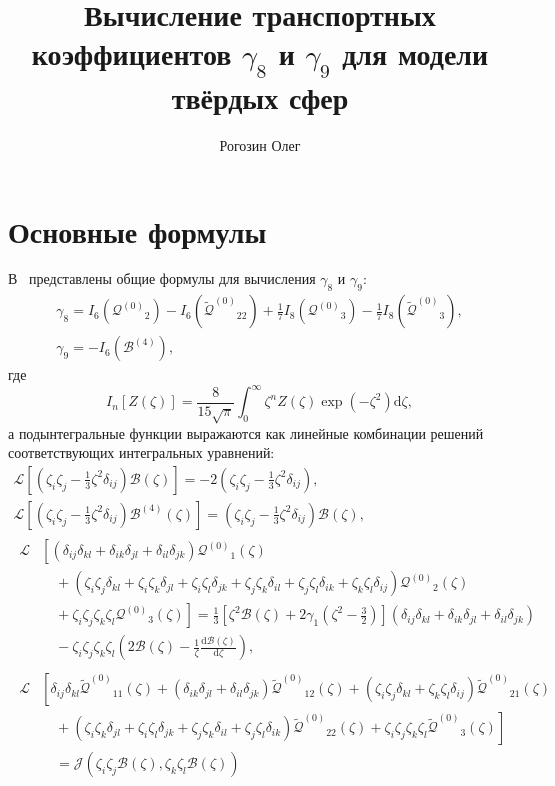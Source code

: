 \documentclass[a4paper,12pt]{article}
\title{Вычисление транспортных коэффициентов \(\gamma_8\) и \(\gamma_9\) для модели твёрдых сфер}
\author{Рогозин Олег}
\newcommand{\dd}{\mathrm{d}}
\newcommand{\der}[2][]{\frac{\dd#1}{\dd#2}}
\newcommand{\Q}{\ensuremath{\mathcal{Q}^{(0)}}}
\newcommand{\B}{\ensuremath{\mathcal{B}^{(4)}}}
\newcommand{\QQ}{\ensuremath{\tilde{\mathcal{Q}}^{(0)}}}
\newcommand{\ZZD}[3]{\zeta_{#1}\zeta_{#2}\delta_{#3}}
\newcommand{\ZZZZ}{\zeta_i\zeta_j\zeta_k\zeta_l}
\newcommand{\DD}[2]{\delta_{#1}\delta_{#2}}
\begin{document}
\maketitle
\tableofcontents

\section{Основные формулы}

В~\cite{Sone2000, Sone2002} представлены общие формулы для вычисления \(\gamma_8\) и \(\gamma_9\):
\begin{gather}
    \gamma_8 = I_6(\Q_2) - I_6(\QQ_{22}) + \frac17 I_8(\Q_3) - \frac17 I_8(\QQ_3), \label{eq:gamma_8}\\
    \gamma_9 = -I_6(\B), \label{eq:gamma_9}
\end{gather}
где
\begin{equation}\label{eq:I_n}
    I_n[Z(\zeta)] = \frac{8}{15\sqrt\pi} \int_0^\infty \zeta^n Z(\zeta) \exp(-\zeta^2) \dd\zeta,
\end{equation}
а подынтегральные функции выражаются как линейные комбинации решений соответствующих интегральных уравнений:
\begin{gather}
    \mathcal{L}\left[\left(\zeta_i\zeta_j-\frac13\zeta^2\delta_{ij}\right)\mathcal{B}(\zeta)\right] =
        -2\left(\zeta_i\zeta_j-\frac13\zeta^2\delta_{ij}\right), \label{eq:B}\\
    \mathcal{L}\left[\left(\zeta_i\zeta_j-\frac13\zeta^2\delta_{ij}\right)\B(\zeta)\right] =
        \left(\zeta_i\zeta_j-\frac13\zeta^2\delta_{ij}\right)\mathcal{B}(\zeta), \label{eq:B_4}\\[6pt]
    \begin{aligned}
    \mathcal{L}&\left[(\DD{ij}{kl}+\DD{ik}{jl}+\DD{il}{jk}) \Q_1(\zeta) \right. \\
        &\quad + \left.(\ZZD{i}{j}{kl}+\ZZD{i}{k}{jl}+\ZZD{i}{l}{jk}+\ZZD{j}{k}{il}+\ZZD{j}{l}{ik}+\ZZD{k}{l}{ij}) \Q_2(\zeta)\right. \\
        &\quad + \left.\ZZZZ \Q_3(\zeta)\right] = \frac13\left[\zeta^2\mathcal{B}(\zeta)+2\gamma_1\left(\zeta^2-\frac32\right)\right](\DD{ij}{kl}+\DD{ik}{jl}+\DD{il}{jk}) \\
        &\quad - \ZZZZ\left(2\mathcal{B}(\zeta) - \frac1\zeta\der[\mathcal{B}(\zeta)]{\zeta}\right),
    \end{aligned}\label{eq:Q}\\[6pt]
    \begin{aligned}
    \mathcal{L}&\left[\DD{ij}{kl}\QQ_{11}(\zeta) + (\DD{ik}{jl}+\DD{il}{jk})\QQ_{12}(\zeta) + (\ZZD{i}{j}{kl}+\ZZD{k}{l}{ij})\QQ_{21}(\zeta) \right. \\
        &\quad + \left.(\ZZD{i}{k}{jl}+\ZZD{i}{l}{jk}+\ZZD{j}{k}{il}+\ZZD{j}{l}{ik}) \QQ_{22}(\zeta) + \ZZZZ \QQ_3(\zeta)\right] \\
        &\quad = \mathcal{J}(\zeta_i\zeta_j\mathcal{B}(\zeta), \zeta_k\zeta_l\mathcal{B}(\zeta))
    \end{aligned}\label{eq:QQ}
\end{gather}
\end{document}
